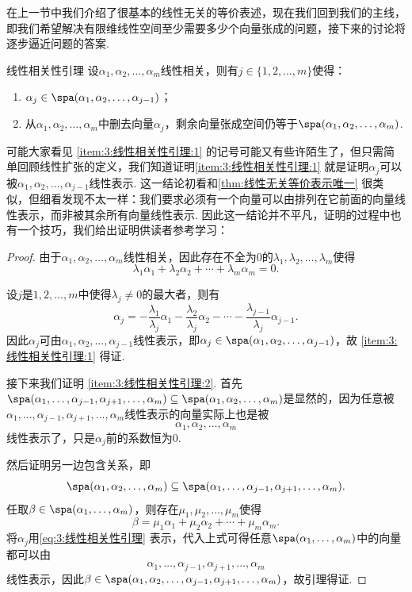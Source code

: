 在上一节中我们介绍了很基本的线性无关的等价表述，现在我们回到我们的主线，即我们希望解决有限维线性空间至少需要多少个向量张成的问题，接下来的讨论将逐步逼近问题的答案.
\begin{lemma}{}{线性相关性引理}
    设$\alpha_1,\alpha_2,\ldots,\alpha_m$线性相关，则有$j\in\{1,2,\ldots,m\}$使得：
    \begin{enumerate}
        \item \label{item:3:线性相关性引理:1}
              $\alpha_j \in \spa(\alpha_1,\alpha_2,\ldots,\alpha_{j-1})$；

        \item \label{item:3:线性相关性引理:2}
              从$\alpha_1,\alpha_2,\ldots,\alpha_m$中删去向量$\alpha_j$，剩余向量张成空间仍等于$\spa(\alpha_1,\alpha_2,\ldots,\alpha_m)$.
    \end{enumerate}
\end{lemma}
可能大家看见 \ref*{item:3:线性相关性引理:1} 的记号可能又有些许陌生了，但只需简单回顾线性扩张的定义，我们知道证明\ref*{item:3:线性相关性引理:1} 就是证明$\alpha_j$可以被$\alpha_1,\alpha_2,\ldots,\alpha_{j-1}$线性表示. 这一结论初看和\autoref{thm:线性无关等价表示唯一} 很类似，但细看发现不太一样：我们要求必须有一个向量可以由排列在它前面的向量线性表示，而非被其余所有向量线性表示. 因此这一结论并不平凡，证明的过程中也有一个技巧，我们给出证明供读者参考学习：

\begin{proof}
    由于$\alpha_1,\alpha_2,\ldots,\alpha_m$线性相关，因此存在不全为0的$\lambda_1,\lambda_2,\ldots,\lambda_m$使得
    \[\lambda_1\alpha_1+\lambda_2\alpha_2+\cdots+\lambda_m\alpha_m=0.\]

    设$j$是$1,2,\ldots,m$中使得$\lambda_j\neq 0$的最大者，则有
    \begin{equation}\label{eq:3:线性相关性引理}
        \alpha_j=-\frac{\lambda_1}{\lambda_j}\alpha_1-\frac{\lambda_2}{\lambda_j}\alpha_2-\cdots-\frac{\lambda_{j-1}}{\lambda_j}\alpha_{j-1}.
    \end{equation}
    因此$\alpha_j$可由$\alpha_1,\alpha_2,\ldots,\alpha_{j-1}$线性表示，即$\alpha_j\in\spa(\alpha_1,\alpha_2,\ldots,\alpha_{j-1})$，故 \ref*{item:3:线性相关性引理:1} 得证.

    接下来我们证明 \ref*{item:3:线性相关性引理:2}. 首先$\spa(\alpha_1,\ldots,\alpha_{j-1},\alpha_{j+1},\ldots,\alpha_m)\subseteq\spa(\alpha_1,\alpha_2,\ldots,\alpha_m)$是显然的，因为任意被$\alpha_1,\ldots,\alpha_{j-1},\alpha_{j+1},\ldots,\alpha_m$线性表示的向量实际上也是被
    \[\alpha_1,\alpha_2,\ldots,\alpha_m\]
    线性表示了，只是$\alpha_j$前的系数恒为0.

    然后证明另一边包含关系，即
    \[\spa(\alpha_1,\alpha_2,\ldots,\alpha_m)\subseteq\spa(\alpha_1,\ldots,\alpha_{j-1},\alpha_{j+1},\ldots,\alpha_m).\]
    任取$\beta\in\spa(\alpha_1,\ldots,\alpha_m)$，则存在$\mu_1,\mu_2,\ldots,\mu_m$使得
    \[\beta=\mu_1\alpha_1+\mu_2\alpha_2+\cdots+\mu_m\alpha_m.\]
    将$\alpha_j$用\autoref{eq:3:线性相关性引理} 表示，代入上式可得任意$\spa(\alpha_1,\ldots,\alpha_m)$中的向量都可以由\[\alpha_1,\ldots,\alpha_{j-1},\alpha_{j+1},\ldots,\alpha_m\]线性表示，因此$\beta\in\spa(\alpha_1,\alpha_2,\ldots,\alpha_{j-1},\alpha_{j+1},\ldots,\alpha_m)$，故引理得证.
\end{proof}


